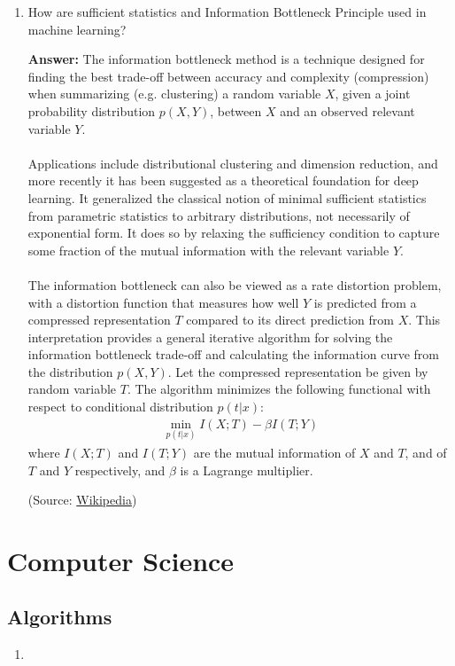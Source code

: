 \documentclass{article}
\newenvironment{QandA}{\begin{enumerate}[label=\arabic*.]}{\end{enumerate}}
\newenvironment{answer}{\par\normalfont \textbf{Answer:}}{}
\newcommand{\g}{\vert}
\begin{document}
\begin{QandA}
    \item How are sufficient statistics and Information Bottleneck Principle used in machine learning?
    \begin{answer}
        The information bottleneck method is a technique designed for finding the best trade-off between accuracy and complexity (compression) when summarizing (e.g. clustering) a random variable $X$, given a joint probability distribution $p(X, Y)$, between $X$ and an observed relevant variable $Y$. \\\\
        Applications include distributional clustering and dimension reduction, and more recently it has been suggested as a theoretical foundation for deep learning. It generalized the classical notion of minimal sufficient statistics from parametric statistics to arbitrary distributions, not necessarily of exponential form. It does so by relaxing the sufficiency condition to capture some fraction of the mutual information with the relevant variable $Y$. \\\\
        The information bottleneck can also be viewed as a rate distortion problem, with a distortion function that measures how well $Y$ is predicted from a compressed representation $T$ compared to its direct prediction from $X$. This interpretation provides a general iterative algorithm for solving the information bottleneck trade-off and calculating the information curve from the distribution $p(X,Y)$.
        Let the compressed representation be given by random variable $T$. The algorithm minimizes the following functional with respect to conditional distribution $p(t \g x)$:
        \begin{align*}
            \min_{p(t \g x)} I(X; T) - \beta I(T; Y)
        \end{align*}
        where $I(X; T)$ and $I(T; Y)$ are the mutual information of $X$ and $T$, and of $T$ and $Y$ respectively, and $\beta$ is a Lagrange multiplier.
        
        (Source: \href{https://en.wikipedia.org/wiki/Information_bottleneck_method}{Wikipedia})
    \end{answer}

\end{QandA}

\section{Computer Science}
\subsection{Algorithms}
\begin{QandA}
    \item 
\end{QandA}
\end{document}
